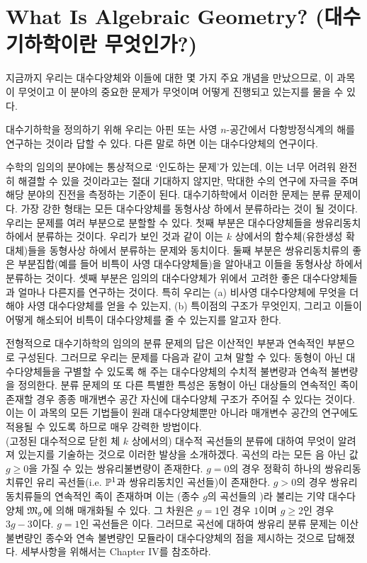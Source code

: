 	
	
	\section{What Is Algebraic Geometry? (대수기하학이란 무엇인가?)}
	지금까지 우리는 대수다양체와 이들에 대한 몇 가지 주요 개념을 만났으므로,
	이 과목이 무엇이고 이 분야의 중요한 문제가 무엇이며 어떻게 진행되고 있는지를 물을 수 있다.
	
	대수기하학을 정의하기 위해 우리는 아핀 또는 사영 $n$-공간에서 다항방정식계의 해를 연구하는 것이라 답할 수 있다.
	다른 말로 하면 이는 대수다양체의 연구이다.
	
	수학의 임의의 분야에는 통상적으로 `인도하는 문제'가 있는데, 이는 너무 어려워 완전히 해결할 수 있을 것이라고는
	절대 기대하지 않지만, 막대한 수의 연구에 자극을 주며 해당 분야의 진전을 측정하는 기준이 된다.
	대수기하학에서 이러한 문제는 분류 문제이다. 가장 강한 형태는 모든 대수다양체를 동형사상 하에서 분류하라는 것이 될 것이다.
	우리는 문제를 여러 부분으로 분할할 수 있다.
	첫째 부분은 대수다양체들을 쌍유리동치 하에서 분류하는 것이다.
	우리가 보인 것과 같이 이는 $k$ 상에서의 함수체(유한생성 확대체)들을 동형사상 하에서 분류하는 문제와 동치이다.
	둘째 부분은 쌍유리동치류의 좋은 부분집합(예를 들어 비특이 사영 대수다양체들)을 알아내고 이들을 동형사상 하에서 분류하는 것이다.
	셋째 부분은 임의의 대수다양체가 위에서 고려한 좋은 대수다양체들과 얼마나 다른지를 연구하는 것이다.
	특히 우리는 (a) 비사영 대수다양체에 무엇을 더해야 사영 대수다양체를 얻을 수 있는지,
	(b) 특이점의 구조가 무엇인지, 그리고 이들이 어떻게 해소되어 비특이 대수다양체를 줄 수 있는지를 알고자 한다.
	
	전형적으로 대수기하학의 임의의 분류 문제의 답은 이산적인 부분과 연속적인 부분으로 구성된다.
	그러므로 우리는 문제를 다음과 같이 고쳐 말할 수 있다:
	동형이 아닌 대수다양체들을 구별할 수 있도록 해 주는 대수다양체의 수치적 불변량과 연속적 불변량을 정의한다.
	분류 문제의 또 다른 특별한 특성은 동형이 아닌 대상들의 연속적인 족이 존재할 경우 종종
	매개변수 공간 자신에 대수다양체 구조가 주어질 수 있다는 것이다.
	이는 이 과목의 모든 기법들이 원래 대수다양체뿐만 아니라 매개변수 공간의 연구에도 적용될 수 있도록 하므로 매우 강력한 방법이다.\\
	
	(고정된 대수적으로 닫힌 체 $k$ 상에서의) 대수적 곡선들의 분류에 대하여
	무엇이 알려져 있는지를 기술하는 것으로 이러한 발상을 소개하겠다.
	곡선의 라는 모든 음 아닌 값 $g\ge 0$을 가질 수 있는 쌍유리불변량이 존재한다.
	$g=0$의 경우 정확히 하나의 쌍유리동치류인 유리 곡선들(i.e. $\mathbb{P}^1$과 쌍유리동치인 곡선들)이 존재한다.
	$g>0$의 경우 쌍유리동치류들의 연속적인 족이 존재하며
	이는 (종수 $g$의 곡선들의 )라 불리는 기약 대수다양체 $\mathfrak{M}_g$에 의해 매개화될 수 있다.
	그 차원은 $g=1$인 경우 $1$이며 $g\ge 2$인 경우 $3g-3$이다. $g=1$인 곡선들은 이다.
	그러므로 곡선에 대하여 쌍유리 분류 문제는 이산 불변량인 종수와 연속 불변량인 모듈라이 대수다양체의 점을 제시하는 것으로 답해졌다.
	세부사항을 위해서는 Chapter IV를 참조하라.
	
